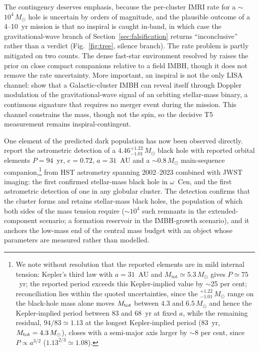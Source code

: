 \documentclass[11pt]{article}
\newcommand{\msun}{\ensuremath{M_\odot}}
\begin{document}
The contingency deserves emphasis, because the per-cluster IMRI rate for a $\sim$$10^{4}\,\msun$ hole is uncertain by orders of magnitude, and the plausible outcome of a 4--10~yr mission is that no inspiral is caught in-band, in which case the gravitational-wave branch of Section~\ref{sec:falsification} returns ``inconclusive'' rather than a verdict (Fig.~\ref{fig:tree}, silence branch). The rate problem is partly mitigated on two counts. The dense fast-star environment resolved by \citet{Haberle2024Nature} raises the prior on close compact companions relative to a field IMBH, though it does not remove the rate uncertainty. More important, an inspiral is not the only LISA channel: \citet{Strokov2022} show that a Galactic-cluster IMBH can reveal itself through Doppler modulation of the gravitational-wave signal of an orbiting stellar-mass binary, a continuous signature that requires no merger event during the mission. This channel constrains the mass, though not the spin, so the decisive T5 measurement remains inspiral-contingent.

One element of the predicted dark population has now been observed directly. \citet{Whitaker2026BH2} report the astrometric detection of a $4.46^{+1.22}_{-1.01}\,\msun$ black hole with reported orbital elements $P = 94$~yr, $e=0.72$, $a = 31$~AU and a $\sim$$0.8\,\msun$ main-sequence companion,\footnote{We note without resolution that the reported elements are in mild internal tension: Kepler's third law with $a = 31$~AU and $M_{\mathrm{tot}} \simeq 5.3\,\msun$ gives $P \simeq 75$~yr; the reported period exceeds this Kepler-implied value by $\sim$25 per cent; reconciliation lies within the quoted uncertainties, since the $^{+1.22}_{-1.01}\,\msun$ range on the black-hole mass alone moves $M_{\rm tot}$ between $4.3$ and $6.5\,\msun$ and hence the Kepler-implied period between $83$ and $68$~yr at fixed $a$, while the remaining residual, $94/83 \simeq 1.13$ at the longest Kepler-implied period ($83$~yr, $M_{\rm tot}=4.3\,\msun$), closes with a semi-major axis larger by $\sim$8 per cent, since $P \propto a^{3/2}$ ($1.13^{2/3} \simeq 1.08$).} from HST astrometry spanning 2002--2023 combined with JWST imaging: the first confirmed stellar-mass black hole in $\omega$~Cen, and the first astrometric detection of one in any globular cluster. The detection confirms that the cluster forms and retains stellar-mass black holes, the population of which both sides of the mass tension require ($\sim$$10^{4}$ such remnants in the extended-component scenario; a formation reservoir in the IMBH-growth scenario), and it anchors the low-mass end of the central mass budget with an object whose parameters are measured rather than modelled.
\end{document}
